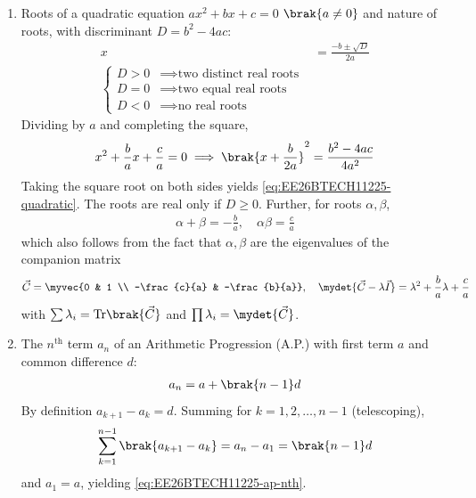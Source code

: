 \begin{enumerate}[label=\thesubsection.\arabic*, ref=\thesubsection.\theenumi]
\item Roots of a quadratic equation $ax^2 + bx + c = 0$ $\brak{a \neq 0}$ and nature of roots, with discriminant $D = b^2 - 4ac$:
\begin{align}
	x &= \frac{-b \pm \sqrt{D}}{2a}
	\label{eq:EE26BTECH11225-quadratic}
	\\
	\begin{cases}
		D > 0 & \implies \text{two distinct real roots} \\
		D = 0 & \implies \text{two equal real roots} \\
		D < 0 & \implies \text{no real roots}
	\end{cases}
	\nonumber
\end{align}
\solution
Dividing by $a$ and completing the square,
\begin{align}
	x^2 + \frac{b}{a}x + \frac{c}{a} = 0
	\implies \brak{x + \frac{b}{2a}}^2 = \frac{b^2 - 4ac}{4a^2}
\end{align}
Taking the square root on both sides yields \eqref{eq:EE26BTECH11225-quadratic}. The roots are real only if $D \geq 0$. Further, for roots $\alpha, \beta$,
\begin{align}
	\alpha + \beta = -\frac{b}{a}, \quad \alpha\beta = \frac{c}{a}
\end{align}
which also follows from the fact that $\alpha, \beta$ are the eigenvalues of the companion matrix
\begin{align}
	\vec{C} = \myvec{0 & 1 \\ -\frac{c}{a} & -\frac{b}{a}},
	\quad
	\mydet{\vec{C} - \lambda\vec{I}} = \lambda^2 + \frac{b}{a}\lambda + \frac{c}{a}
\end{align}
with $\sum \lambda_i = \text{Tr}\brak{\vec{C}}$ and $\prod \lambda_i = \mydet{\vec{C}}$.

\item The $n^{\text{th}}$ term $a_n$ of an Arithmetic Progression (A.P.) with first term $a$ and common difference $d$:
\begin{align}
	a_n = a + \brak{n - 1}d
	\label{eq:EE26BTECH11225-ap-nth}
\end{align}
\solution
By definition $a_{k+1} - a_k = d$. Summing for $k = 1, 2, \ldots, n-1$ (telescoping),
\begin{align}
	\sum_{k=1}^{n-1}\brak{a_{k+1} - a_k} = a_n - a_1 = \brak{n - 1}d
\end{align}
and $a_1 = a$, yielding \eqref{eq:EE26BTECH11225-ap-nth}.


\end{enumerate}
